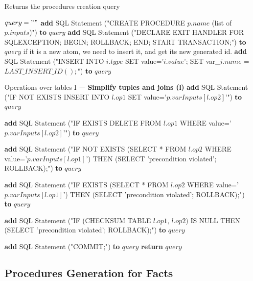 \documentclass[oneside]{book}
\begin{document}
\begin{algorithm}
\caption{Returns the procedures creation query}
\label{array-sum2}
\begin{algorithmic}[2]
	\State $query = ""$
	\State \textbf{add} SQL Statement ("CREATE PROCEDURE $p.name$ (list of $p.inputs$)") \textbf{to} $query$
	\State \textbf{add} SQL Statement ("DECLARE EXIT HANDLER FOR SQLEXCEPTION; BEGIN; ROLLBACK; END; START TRANSACTION;") \textbf{to} $query$
		 \Comment if it is a new atom, we need to insert it, and get its new generated id.
			 \State \textbf{add} SQL Statement ("INSERT INTO $i.type$ SET value='$i.value$'; SET var\_$i.name$ = $LAST\_INSERT\_ID();$") \textbf{to} $query$
			\EndIf
		\EndFor
		
		 \Comment Operations over tables
			\State \textbf{l = Simplify tuples and joins (l)}
			 \State \textbf{add} SQL Statement ("IF NOT EXISTS INSERT INTO $l.op1$ SET value='$p.varInputs[l.op2]$'") \textbf{to} $query$
			
			 \State \textbf{add} SQL Statement ("IF EXISTS DELETE FROM $l.op1$ WHERE value='$p.varInputs[l.op2]$'") \textbf{to} $query$
			
			 \State \textbf{add} SQL Statement ("IF NOT EXISTS (SELECT * FROM $l.op2$ WHERE value='$p.varInputs[l.op1]$') THEN (SELECT 'precondition violated'; ROLLBACK);") \textbf{to} $query$
			
			 \State \textbf{add} SQL Statement ("IF EXISTS (SELECT * FROM $l.op2$ WHERE value='$p.varInputs[l.op1]$') THEN (SELECT 'precondition violated'; ROLLBACK);") \textbf{to} $query$
			
			 \State \textbf{add} SQL Statement ("IF (CHECKSUM TABLE $l.op1$, $l.op2$) IS NULL THEN (SELECT 'precondition violated'; ROLLBACK);") \textbf{to} $query$
			
			\EndIf
		\EndFor

	\State \textbf{add} SQL Statement ("COMMIT;") \textbf{to} $query$
	\EndFor
	\State \textbf{return} $query$
\EndFunction
\end{algorithmic}
\end{algorithm}

\newpage

\subsection{Procedures Generation for Facts}
\end{document}
